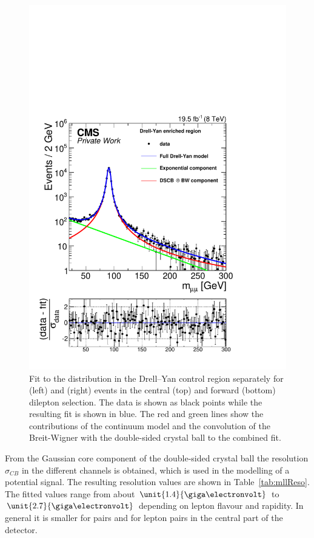 \begin{figure}[htbp]
\begin{minipage}[t]{0.49\textwidth}
\includegraphics[width=\textwidth]{plots/results/fit/expoFitMM_Log_Forward.pdf}
\end{minipage}
\caption{Fit to the \mll distribution in the Drell--Yan control region separately for \EE (left) and \MM (right) events in the central (top) and forward (bottom) dilepton selection. The data is shown as black points while the resulting fit is shown in blue. The red and green lines show the contributions of the continuum model and the convolution of the Breit-Wigner with the double-sided crystal ball to the combined fit.}
\label{fig:dyFits}
\end{figure}
From the Gaussian core component of the double-sided crystal ball the \mll resolution $\sigma_{CB}$ in the different channels is obtained, which is used in the modelling of a potential signal. The resulting resolution values are shown in Table~\ref{tab:mllReso}. The fitted values range from about $\unit{1.4}{\giga\electronvolt}$ to $\unit{2.7}{\giga\electronvolt}$ depending on lepton flavour and rapidity. In general it is smaller for \MM pairs and for lepton pairs in the central part of the detector.  

